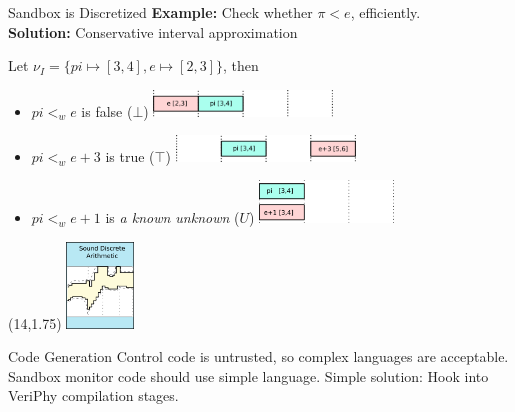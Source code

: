 \documentclass[slidestop,aspectratio=169]{beamer}
\theoremstyle{plain}
\theoremstyle{definition}
\theoremstyle{remark}
\begin{document}
\begin{frame}{Sandbox is Discretized}
\textbf{Example:} Check whether $\pi < e$, efficiently.\\
\textbf{Solution:} Conservative interval approximation
\begin{example}
Let $\nu_I=\{pi\mapsto[3,4],e\mapsto[2,3]\}$, then 
\begin{itemize}
\item<+-> \(pi <_w e\) is false ($\bot$)\hspace{1.63in}
\includegraphics[width=1.875in]{img/interval1.png}
\item<+-> \(pi <_w e + 3\) is true ($\top$)\hspace{1.4in}
\includegraphics[width=1.875in]{img/interval2.png}
\item<+-> \(pi <_w e + 1\) is \emph{a known unknown} ($U$){\hspace{0.50875in}
\includegraphics[width=1.40625in]{img/interval3.png}
}
\end{itemize}
\end{example}
\begin{textblock}{10}(14,1.75)
\includegraphics[width=0.7in]{img/focus-int.png}
\end{textblock}
\end{frame}

\begin{frame}[t]{Code Generation}
Control code is untrusted, so complex languages are acceptable.
Sandbox monitor code should use simple language.
Simple solution: Hook into VeriPhy compilation stages.
\end{frame}
\end{document}
